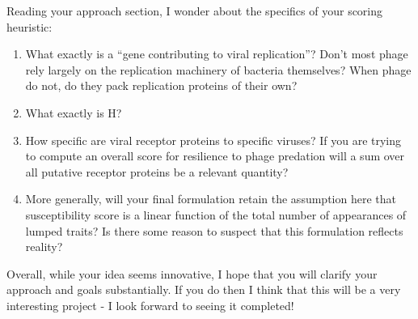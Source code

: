 \documentclass{letter}
\begin{document}
Reading your approach section, I wonder about the specifics of your scoring heuristic:

\begin{enumerate}
\item{What exactly is a ``gene contributing to viral replication''? Don't most phage rely largely on the replication machinery of bacteria themselves? When phage do not, do they pack replication proteins of their own?}
\item{What exactly is H?}
\item{How specific are viral receptor proteins to specific viruses? If you are trying to compute an overall score for resilience to phage predation will a sum over all putative receptor proteins be a relevant quantity?}
\item{More generally, will your final formulation retain the assumption here that susceptibility score is a linear function of the total number of appearances of lumped traits? Is there some reason to suspect that this formulation reflects reality?}
\end{enumerate}

Overall, while your idea seems innovative, I hope that you will clarify your approach and goals substantially. If you do then I think that this will be a very interesting project - I look forward to seeing it completed!
\end{document}
